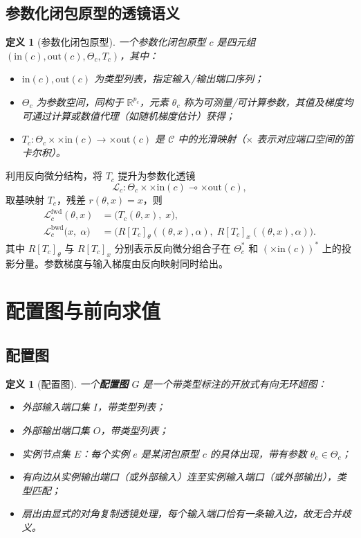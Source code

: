 \documentclass{ctexart}
\newcommand{\bigtimes}{\times}
\newtheorem{definition}[theorem]{定义}
\newcommand{\lensarrow}{\multimap}
\begin{document}
\subsection{参数化闭包原型的透镜语义}

\begin{definition}[参数化闭包原型]
一个参数化闭包原型 $c$ 是四元组 $(\mathrm{in}(c), \mathrm{out}(c), \Theta_c, T_c)$，其中：
\begin{itemize}
    \item $\mathrm{in}(c), \mathrm{out}(c)$ 为类型列表，指定输入/输出端口序列；
    \item $\Theta_c$ 为参数空间，同构于 $\mathbb{R}^{p_c}$，元素 $\theta_c$ 称为可测量/可计算参数，其值及梯度均可通过计算或数值代理（如随机梯度估计）获得；
    \item $T_c : \Theta_c \times \bigtimes \mathrm{in}(c) \to \bigtimes \mathrm{out}(c)$ 是 $\mathcal{C}$ 中的光滑映射（$\bigtimes$ 表示对应端口空间的笛卡尔积）。
\end{itemize}
\end{definition}

利用反向微分结构，将 $T_c$ 提升为参数化透镜
\[
\mathcal{L}_c : \Theta_c \times \bigtimes \mathrm{in}(c) \lensarrow \bigtimes \mathrm{out}(c),
\]
取基映射 $T_c$，残差 $r(\theta, x) = x$，则
\[
\begin{aligned}
\mathcal{L}_c^{\mathrm{fwd}}(\theta, x) &= \big( T_c(\theta, x),\; x \big),\\
\mathcal{L}_c^{\mathrm{bwd}}\big(x,\; \alpha \big) &= \big( R[T_c]_\theta((\theta, x), \alpha),\; R[T_c]_x((\theta, x), \alpha) \big).
\end{aligned}
\]
其中 $R[T_c]_\theta$ 与 $R[T_c]_x$ 分别表示反向微分组合子在 $\Theta_c^*$ 和 $(\bigtimes \mathrm{in}(c))^*$ 上的投影分量。参数梯度与输入梯度由反向映射同时给出。

\section{配置图与前向求值}

\subsection{配置图}

\begin{definition}[配置图]
一个\textbf{配置图} $G$ 是一个带类型标注的开放式有向无环超图：
\begin{itemize}
    \item 外部输入端口集 $I$，带类型列表；
    \item 外部输出端口集 $O$，带类型列表；
    \item 实例节点集 $E$：每个实例 $e$ 是某闭包原型 $c$ 的具体出现，带有参数 $\theta_e \in \Theta_c$；
    \item 有向边从实例输出端口（或外部输入）连至实例输入端口（或外部输出），类型匹配；
    \item 扇出由显式的对角复制透镜处理，每个输入端口恰有一条输入边，故无合并歧义。
\end{itemize}
\end{definition}
\end{document}
